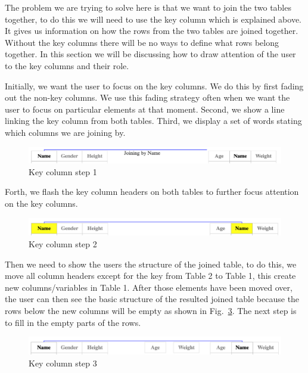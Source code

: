 The problem we are trying to solve here is that we want to join the two tables together, to do this we will need to use the key column which is explained above. It gives us information on how the rows from the two tables are joined together. Without the key columns there will be no ways to define what rows belong together. In this section we will be discussing how to draw attention of the user to the key columns and their role. 

Initially, we want the user to focus on the key columns. We do this by first fading out the non-key columns. We use this fading strategy often when we want the user to focus on particular elements at that moment. Second, we show a line linking the key column from both tables. Third, we display a set of words stating which columns we are joining by.


\begin{figure}[H]
    \includegraphics[scale = 0.25]{Masters-Thesis/img/keycol1.png}
    \caption{Key column step 1}
    \label{fig:keycol1}
\end{figure}

Forth, we flash the key column headers on both tables to further focus attention on the key columns.

\begin{figure}[H]
    \includegraphics[scale = 0.25]{Masters-Thesis/img/keycol2.png}
    \caption{Key column step 2}
    \label{fig:keycol2}
\end{figure}

Then we need to show the users the structure of the joined table, to do this, we move all column headers except for the key from Table 2 to Table 1, this create new columns/variables in Table 1. After those elements have been moved over, the user can then see the basic structure of the resulted joined table because the rows below the new columns will be empty as shown in Fig.~\ref{fig:keycol3}. The next step is to fill in the empty parts of the rows.

\begin{figure}[H]
    \includegraphics[scale = 0.25]{Masters-Thesis/img/keycol3.png}
    \caption{Key column step 3}
    \label{fig:keycol3}
\end{figure}

